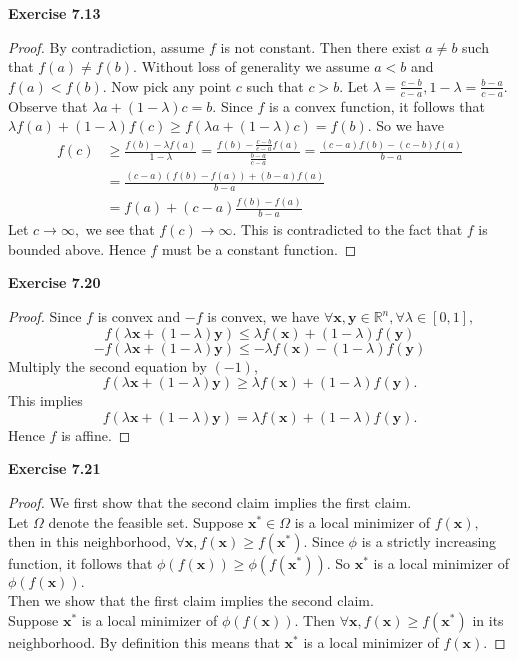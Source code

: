 \documentclass[letterpaper,12pt]{article}
\theoremstyle{definition}
\renewcommand{\vec}[1]{\mathbf{#1}}
\begin{document}
\noindent\textbf{Exercise 7.13}
\begin{proof}
  By contradiction, assume $f$ is not constant. Then there exist $a \neq b$ such that $f(a) \neq f(b).$ Without loss of generality we assume $a<b$ and $f(a) <  f(b).$ Now pick any point $c$ such that $c>b.$ Let $\lambda = \frac{c-b}{c-a}, 1-\lambda = \frac{b-a}{c-a}.$ Observe that $\lambda a + (1-\lambda) c = b.$ Since $f$ is a convex function, it follows that $\lambda f(a) + (1-\lambda) f(c) \geq f(\lambda a + (1-\lambda) c) = f(b).$ So we have
  \begin{align*}
    f(c) &\geq \frac{f(b) - \lambda f(a)}{1-\lambda} = \frac{f(b) - \frac{c-b}{c-a}f(a)}{\frac{b-a}{c-a}} = \frac{(c-a)f(b) - (c-b) f(a)}{b-a} \\
    &= \frac{(c-a)(f(b)-f(a)) + (b-a)f(a)}{b-a} \\
    &= f(a) + (c-a) \frac{f(b) - f(a)}{b-a}
  \end{align*}
  Let $c\to \infty,$ we see that $f(c) \to \infty.$ This is contradicted to the fact that $f$ is bounded above. Hence $f$ must be a constant function.
\end{proof}

\noindent\textbf{Exercise 7.20}
\begin{proof}
  Since $f$ is convex and $-f$ is convex, we have $\forall \vec{x}, \vec{y} \in \mathbb{R}^n, \forall \lambda \in [0,1],$
  \begin{equation}
    f(\lambda \vec{x}  + (1-\lambda )\vec{y} ) \leq \lambda f(\vec{x} ) + (1-\lambda )f(\vec{y} )
  \end{equation}
  \begin{equation}
    -f(\lambda \vec{x}  + (1-\lambda )\vec{y} ) \leq -\lambda f(\vec{x} ) - (1-\lambda )f(\vec{y} )
  \end{equation}
  Multiply the second equation by $(-1)$,
  $$f(\lambda \vec{x}  + (1-\lambda )\vec{y} ) \geq \lambda f(\vec{x} ) +(1-\lambda )f(\vec{y}).$$
  This implies $$f(\lambda \vec{x}+(1-\lambda)\vec{y})=\lambda f(\vec{x})+ (1-\lambda )f(\vec{y}).$$ Hence $f$ is affine.
\end{proof}


\noindent\textbf{Exercise 7.21}
\begin{proof}
We first show that the second claim implies the first claim.\\
Let $\Omega$ denote the feasible set. Suppose $\vec{x}^* \in \Omega$ is a local minimizer of $f(\vec{x}),$ then in this neighborhood, $\forall \vec{x}, f(\vec{x}) \geq f(\vec{x}^*).$ Since $\phi$ is a strictly increasing function, it follows that $\phi(f(\vec{x})) \geq \phi(f(\vec{x}^*)).$ So $\vec{x}^*$ is a local minimizer of $\phi(f(\vec{x})).$ \\
Then we show that the first claim implies the second claim. \\
Suppose $\vec{x}^*$ is a local minimizer of $\phi(f(\vec{x})).$ Then $\forall \vec{x}, f(\vec{x}) \geq f(\vec{x}^*)$ in its neighborhood. By definition this means that $\vec{x}^*$ is a local minimizer of $f(\vec{x}).$
\end{proof}
\end{document}
